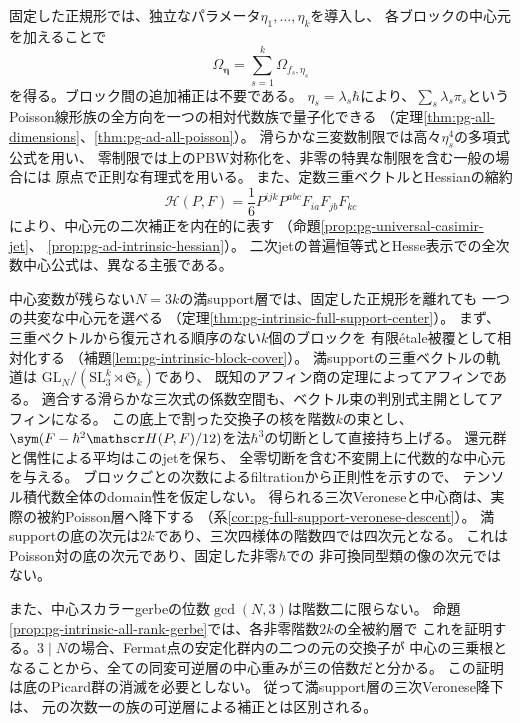 固定した正規形では、独立なパラメータ$\eta_1,\ldots,\eta_k$を導入し、
各ブロックの中心元を加えることで
\begin{equation}\label{eq:intro-independent-center}
 \Omega_{\boldsymbol\eta}=\sum_{s=1}^k\Omega_{f_s,\eta_s}
\end{equation}
を得る。ブロック間の追加補正は不要である。
$\eta_s=\lambda_s\hbar$により、$\sum_s\lambda_s\pi_s$という
Poisson線形族の全方向を一つの相対代数族で量子化できる
（定理\ref{thm:pg-all-dimensions}、\ref{thm:pg-ad-all-poisson}）。
滑らかな三変数制限では高々$\eta_s^4$の多項式公式を用い、
零制限では上のPBW対称化を、非零の特異な制限を含む一般の場合には
原点で正則な有理式を用いる。
また、定数三重ベクトルとHessianの縮約
\begin{equation}\label{eq:intro-intrinsic-hessian}
 \mathscr H(P,F)=\frac16P^{ijk}P^{abc}F_{ia}F_{jb}F_{kc}
\end{equation}
により、中心元の二次補正を内在的に表す
（命題\ref{prop:pg-universal-casimir-jet}、
\ref{prop:pg-ad-intrinsic-hessian}）。
二次jetの普遍恒等式とHesse表示での全次数中心公式は、異なる主張である。

中心変数が残らない$N=3k$の満support層では、固定した正規形を離れても
一つの共変な中心元を選べる
（定理\ref{thm:pg-intrinsic-full-support-center}）。
まず、三重ベクトルから復元される順序のない$k$個のブロックを
有限\'etale被覆として相対化する
（補題\ref{lem:pg-intrinsic-block-cover}）。
満supportの三重ベクトルの軌道は
$\mathrm{GL}_N/(\mathrm{SL}_3^k\rtimes\mathfrak S_k)$であり、
既知のアフィン商の定理によってアフィンである。
適合する滑らかな三次式の係数空間も、ベクトル束の判別式主開としてアフィンになる。
この底上で割った交換子の核を階数$k$の束とし、
$\sym(F-\hbar^2\mathscr H(P,F)/12)$を法$\hbar^3$の切断として直接持ち上げる。
還元群と偶性による平均はこのjetを保ち、
全零切断を含む不変開上に代数的な中心元を与える。
ブロックごとの次数によるfiltrationから正則性を示すので、
テンソル積代数全体のdomain性を仮定しない。
得られる三次Veroneseと中心商は、実際の被約Poisson層へ降下する
（系\ref{cor:pg-full-support-veronese-descent}）。
満supportの底の次元は$2k$であり、三次四様体の階数四では四次元となる。
これはPoisson対の底の次元であり、固定した非零$\hbar$での
非可換同型類の像の次元ではない。

また、中心スカラーgerbeの位数$\gcd(N,3)$は階数二に限らない。
命題\ref{prop:pg-intrinsic-all-rank-gerbe}では、各非零階数$2k$の全被約層で
これを証明する。$3\mid N$の場合、Fermat点の安定化群内の二つの元の交換子が
中心の三乗根となることから、全ての同変可逆層の中心重みが三の倍数だと分かる。
この証明は底のPicard群の消滅を必要としない。
従って満support層の三次Veronese降下は、
元の次数一の族の可逆層による補正とは区別される。

